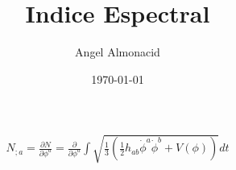 \documentclass{article}
\title{Indice Espectral}
\author{Angel Almonacid}
\date{\today}
\begin{document}
\maketitle

\begin{align*}
  N_{;a}=\frac{\partial N }{\partial \phi^a}=\frac{\partial    }{\partial   \phi^a} \int \sqrt{\frac{1}{3}(\frac{1}{2}h_{ab} \dot \phi^a \dot \phi^b + V(\phi))}dt 
\end{align*}
\end{document}
